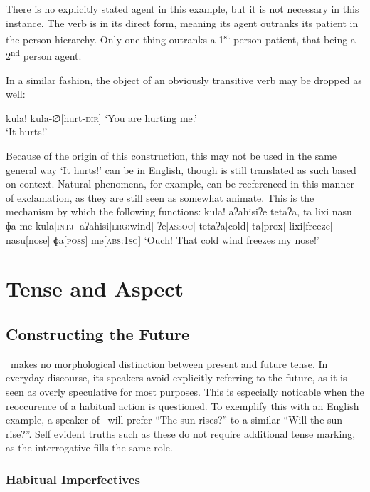 There is no explicitly stated agent in this example, but it is not necessary in this instance.
The verb  is in its direct form, meaning its agent outranks its patient in the person hierarchy.
Only one thing outranks a 1\textsuperscript{st} person patient, that being a 2\textsuperscript{nd} person agent.

In a similar fashion, the object of an obviously transitive verb may be dropped as well:

\ex
\begingl
\glpreamble kula!
\endpreamble
kula-∅[hurt-\textsc{dir}]
\glft `You are hurting me.'\\`It hurts!'
\endgl
\xe

Because of the origin of this construction, this may not be used in the same general way `It hurts!' can be in English, though  is still translated as such based on context.
Natural phenomena, for example, can be reeferenced in this manner of exclamation, as they are still seen as somewhat animate.
This is the mechanism by which the following functions:
\ex
\begingl
\glpreamble kula! aʔahisiʔe tetaʔa, ta lixi nasu ɸa me\endpreamble
kula[\textsc{intj}]
aʔahisi[\textsc{erg:}wind]
ʔe[\textsc{assoc}]
tetaʔa[cold]
ta[prox]
lixi[freeze]
nasu[nose]
ɸa[\textsc{poss}]
me[\textsc{abs:1sg}]
\glft `Ouch! That cold wind freezes my nose!'
\endgl
\xe

\section{Tense and Aspect}
\subsection{Constructing the Future}

\langname\ makes no morphological distinction between present and future tense.
In everyday discourse, its speakers avoid explicitly referring to the future, as it is seen as overly speculative for most purposes.
This is especially noticable when the reoccurence of a habitual action is questioned.
To exemplify this with an English example, a speaker of \langname\ will prefer ``The sun rises?'' to a similar ``Will the sun rise?''.
Self evident truths such as these do not require additional tense marking, as the interrogative fills the same role.

\subsubsection{Habitual Imperfectives}

